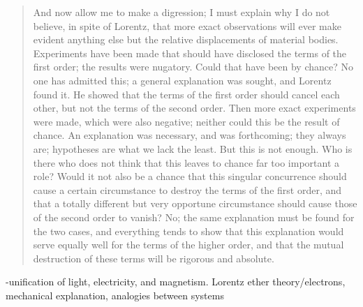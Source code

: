 \documentclass{article}
\begin{document}
\begin{quote}
     And now allow me to make a digression; I must explain why I do not believe, in spite of Lorentz, that more exact observations will ever make evident anything else but the relative displacements of material bodies.  Experiments have been made that should have disclosed the terms of the first order; the results were nugatory.  Could that have been by chance?  No one has admitted this; a general explanation was sought, and Lorentz found it.  He showed that the terms of the first order should cancel each other, but not the terms of the second order.  Then more exact experiments were made, which were also negative; neither could this be the result of chance.  An explanation was necessary, and was forthcoming; they always are; hypotheses are what we lack the least.  But this is not enough.  Who is there who does not think that this leaves to chance far too important a role?  Would it not also be a chance that this singular concurrence should cause a certain circumstance to destroy the terms of the first order, and that a totally different but very opportune circumstance should cause those of the second order to vanish?  No; the same explanation must be found for the two cases, and everything tends to show that this explanation would serve equally well for the terms of the higher order, and that the mutual destruction of these terms will be rigorous and absolute.
     
     \citep[p. 168-172]{Poincare1952}
     
 \end{quote}
 
 -unification of light, electricity, and magnetism.  Lorentz ether theory/electrons, mechanical explanation, analogies between systems
 
\end{document}
